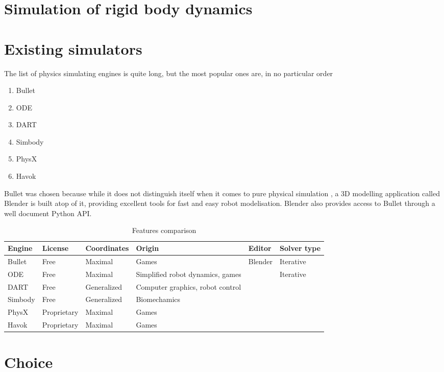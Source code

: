 \section{Simulation of rigid body dynamics}

\section{Existing simulators}
\cite{blender_for_robotics}
The list of physics simulating engines is quite long, but the most popular ones are, in no particular order
\begin{enumerate}
\item Bullet
\item ODE
\item DART
\item Simbody
\item PhysX
\item Havok
\end{enumerate}
Bullet was chosen because while it does not distinguish itself when it comes to pure physical simulation \cite{engines_comparison}, a 3D modelling application called Blender is built atop of it, providing excellent tools for fast and easy robot modelisation. Blender also provides access to Bullet through a well document Python API.

\begin{table}[htp]
\center
\caption{Features comparison}
\begin{tabularx}{\textwidth}{@{} X X X X X X @{}}
\toprule
\textbf{Engine} & \textbf{License} & \textbf{Coordinates} & \textbf{Origin} & \textbf{Editor} &\textbf{Solver type}\\ 
\midrule
Bullet & Free & Maximal & Games & Blender & Iterative \\ 

ODE & Free & Maximal & Simplified robot dynamics, games & & Iterative\\ 

DART & Free & Generalized & Computer graphics, robot control & &\\

Simbody & Free & Generalized & Biomechamics & \\

PhysX & Proprietary & Maximal & Games & \\

Havok & Proprietary & Maximal & Games & \\
\bottomrule
\end{tabularx}
\label{table:specs}
\end{table}
\section{Choice}